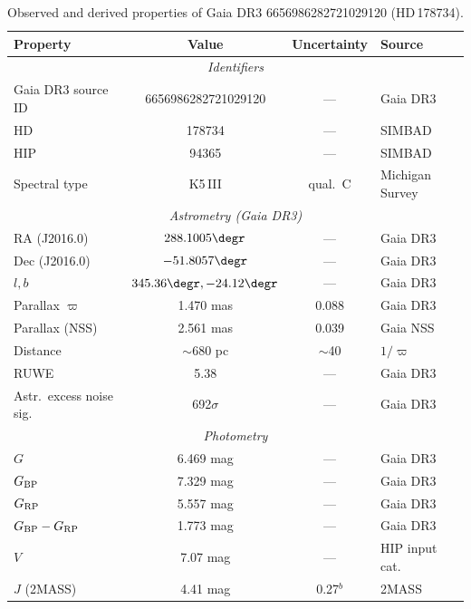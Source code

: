 \documentclass[usenatbib,fleqn]{mnras}
\begin{document}
\begin{table}
\centering
\caption{Observed and derived properties of
Gaia DR3 6656986282721029120 (HD\,178734).}
\label{tab:observed}
\begin{tabular}{lccl}
\toprule
Property & Value & Uncertainty & Source \\
\midrule
\multicolumn{4}{c}{\textit{Identifiers}} \\
Gaia DR3 source ID     & 6656986282721029120  & ---      & Gaia DR3 \\
HD                     & 178734               & ---      & SIMBAD \\
HIP                    & 94365                & ---      & SIMBAD \\
Spectral type          & K5\,III              & qual.~C  & Michigan Survey \\
\midrule
\multicolumn{4}{c}{\textit{Astrometry (Gaia DR3)}} \\
RA (J2016.0)           & $288.1005\degr$      & ---      & Gaia DR3 \\
Dec (J2016.0)          & $-51.8057\degr$      & ---      & Gaia DR3 \\
$l, b$                 & $345.36\degr, -24.12\degr$ & --- & Gaia DR3 \\
Parallax $\varpi$      & 1.470 mas            & 0.088    & Gaia DR3 \\
Parallax (NSS)         & 2.561 mas            & 0.039    & Gaia NSS \\
Distance               & $\sim$680 pc         & $\sim$40 & $1/\varpi$ \\
RUWE                   & 5.38                 & ---      & Gaia DR3 \\
Astr.\ excess noise sig.\ & 692$\sigma$       & ---      & Gaia DR3 \\
\midrule
\multicolumn{4}{c}{\textit{Photometry}} \\
$G$                    & 6.469 mag            & ---      & Gaia DR3 \\
$G_{\rm BP}$           & 7.329 mag            & ---      & Gaia DR3 \\
$G_{\rm RP}$           & 5.557 mag            & ---      & Gaia DR3 \\
$G_{\rm BP} - G_{\rm RP}$ & 1.773 mag         & ---      & Gaia DR3 \\
$V$                    & 7.07 mag             & ---      & HIP input cat. \\
$J$ (2MASS)            & 4.41 mag             & 0.27$^b$ & 2MASS \\

\end{tabular}
\end{table}
\end{document}
